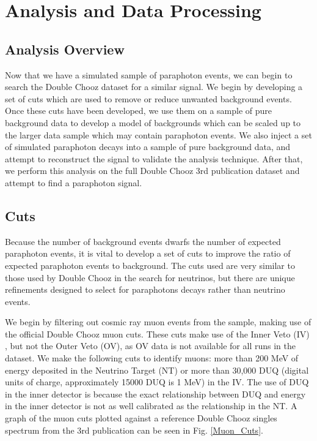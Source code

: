 \section{Analysis and Data Processing}
\subsection{Analysis Overview}
  Now that we have a simulated sample of paraphoton events, we can begin to search the Double Chooz dataset for a similar signal. We begin by developing a set of cuts which are used to remove or reduce unwanted background events. Once these cuts have been developed, we use them on a sample of pure background data to develop a model of backgrounds which can be scaled up to the larger data sample which may contain paraphoton events. We also inject a set of simulated paraphoton decays into a sample of pure background data, and attempt to reconstruct the signal to validate the analysis technique. After that, we perform this analysis on the full Double Chooz 3rd publication dataset and attempt to find a paraphoton signal.

\subsection{Cuts}
\label{sec:Cuts}
Because the number of background events dwarfs the number of expected paraphoton events, it is vital to develop a set of cuts to improve the ratio of expected paraphoton events to background. The cuts used are very similar to those used by Double Chooz in the search for neutrinos, but there are unique refinements designed to select for paraphotons decays rather than neutrino events. 
	
  We begin by filtering out cosmic ray muon events from the sample, making use of the official Double Chooz muon cuts. These cuts make use of the Inner Veto (IV) , but not the Outer Veto (OV), as OV data is not available for all runs in the dataset. We make the following cuts to identify muons: more than 200 MeV of energy deposited in the Neutrino Target (NT) or more than 30,000 DUQ (digital units of charge, approximately 15000 DUQ is 1 MeV) in the IV. The use of DUQ in the inner detector is because the exact relationship between DUQ and energy in the inner detector is not as well calibrated as the relationship in the NT. A graph of the muon cuts plotted against a reference Double Chooz singles spectrum from the 3rd publication can be seen in Fig. \ref{Muon_Cuts}. 
  
